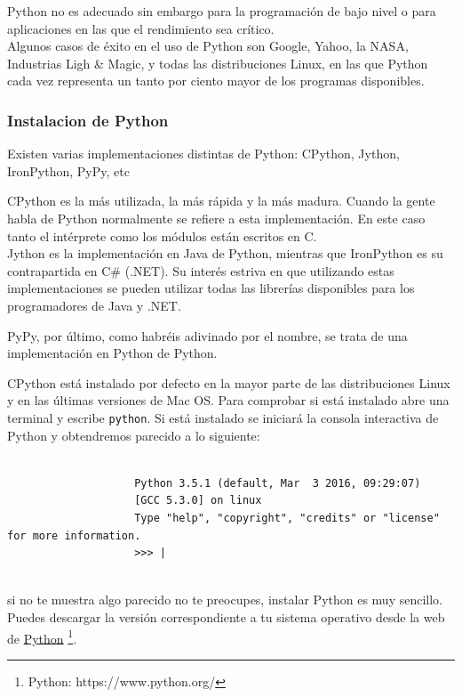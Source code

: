 \documentclass[12pt]{book} %
\begin{document}
		Python no es adecuado sin embargo para la programación de bajo nivel o para aplicaciones en las que el rendimiento sea crítico.\\
		Algunos casos de éxito en el uso de Python son Google, Yahoo, la NASA, Industrias Ligh \& Magic, y todas las distribuciones Linux, 
		en  las que Python cada vez representa un tanto por ciento mayor de los programas disponibles.
		
		\subsubsection{Instalacion de Python}
			Existen varias implementaciones distintas de Python: CPython, Jython, IronPython, PyPy, etc	
			
			CPython es la más utilizada, la más rápida y la más madura. Cuando la gente habla de Python normalmente se refiere a esta
			implementación. 
			En este caso tanto el intérprete como los módulos están escritos en C.\\
			
			Jython es la implementación en Java de Python, mientras que IronPython es su contrapartida en C\# (.NET). Su interés estriva en 
			que utilizando estas implementaciones se pueden utilizar todas las librerías disponibles para los programadores de Java y .NET.

			PyPy, por último, como habréis adivinado por el nombre, se trata de una implementación en Python de Python.
			
			CPython está instalado por defecto en la mayor parte de las distribuciones Linux y en las últimas versiones de Mac OS. Para
			comprobar si está instalado abre una terminal y escribe \texttt{python}. Si está instalado se iniciará la consola interactiva 
			de Python y obtendremos parecido a lo siguiente:
			
			\begin{minipage}[t]{0.3\textwidth}
			\scriptsize			
				\begin{verbatim}

					Python 3.5.1 (default, Mar  3 2016, 09:29:07)
					[GCC 5.3.0] on linux
					Type "help", "copyright", "credits" or "license" for more information.
					>>> |
				\end{verbatim}			
			\end{minipage}
			\\
			si no te muestra algo parecido no te preocupes, instalar Python es muy sencillo. Puedes descargar la versión correspondiente a
			tu sistema operativo desde la web de \href{https://www.python.org/}{Python} 
			\footnote{\scriptsize Python: https://www.python.org/}.
			
\end{document}
